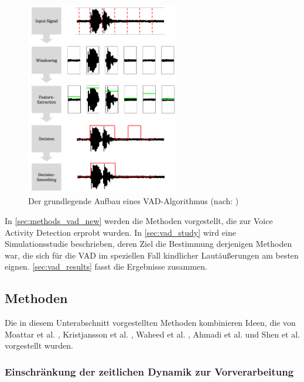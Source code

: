\begin{figure}[h]
	\centering
	\includegraphics[width=0.6\textwidth]{bilder/vad_pipeline_04.png}
	\caption[Der grundlegende Aufbau eines VAD-Algorithmus]{Der grundlegende Aufbau eines VAD-Algorithmus (nach: \cite[S. 8]{vad_granada})}
	\label{img:vad_pipeline}
\end{figure}


In \autoref{sec:methods_vad_new} werden die Methoden vorgestellt, die zur Voice Activity Detection erprobt wurden. In \autoref{sec:vad_study} wird eine Simulationsstudie beschrieben, deren Ziel die Bestimmung derjenigen Methoden war, die sich für die VAD im speziellen Fall kindlicher Lautäußerungen am besten eignen. \autoref{sec:vad_results} fasst die Ergebnisse zusammen.

\subsection{Methoden}
\label{sec:methods_vad_new}

Die in diesem Unterabschnitt vorgestellten Methoden kombinieren Ideen, die von Moattar et al. \cite{vad_Easy}, Kristjansson et al. \cite{vad_Lisboa}, Waheed et al. \cite{vad_entropy}, Ahmadi et al. \cite{vad_ceps} und Shen et al. \cite{vad_entropie02} vorgestellt wurden.

\subsubsection{Einschränkung der zeitlichen Dynamik zur Vorverarbeitung}
\label{sec:preprocessing}

